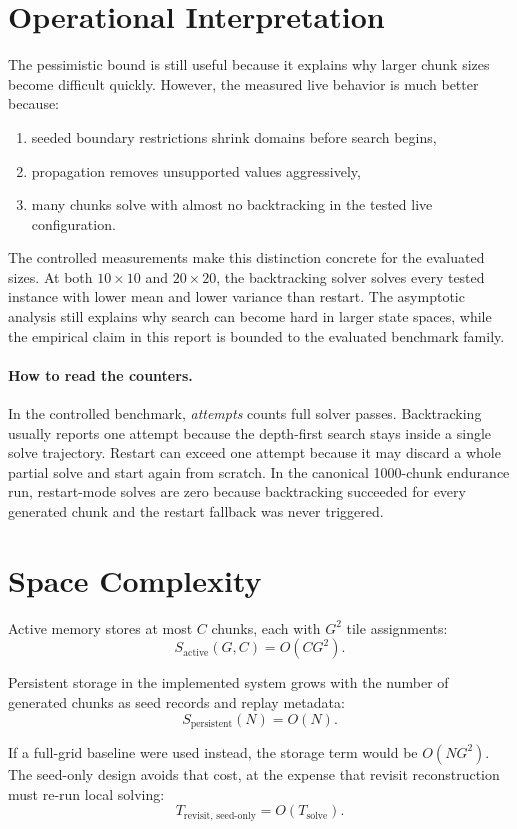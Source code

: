 \documentclass[12pt,a4paper]{report}
\begin{document}
\section{Operational Interpretation}
The pessimistic bound is still useful because it explains why larger chunk sizes become difficult quickly. However, the measured live behavior is much better because:
\begin{enumerate}
\item seeded boundary restrictions shrink domains before search begins,
\item propagation removes unsupported values aggressively,
\item many chunks solve with almost no backtracking in the tested live configuration.
\end{enumerate}

The controlled measurements make this distinction concrete for the evaluated sizes. At both $10 \times 10$ and $20 \times 20$, the backtracking solver solves every tested instance with lower mean and lower variance than restart. The asymptotic analysis still explains why search can become hard in larger state spaces, while the empirical claim in this report is bounded to the evaluated benchmark family.

\paragraph{How to read the counters.} In the controlled benchmark, \emph{attempts} counts full solver passes. Backtracking usually reports one attempt because the depth-first search stays inside a single solve trajectory. Restart can exceed one attempt because it may discard a whole partial solve and start again from scratch. In the canonical 1000-chunk endurance run, restart-mode solves are zero because backtracking succeeded for every generated chunk and the restart fallback was never triggered.

\section{Space Complexity}
Active memory stores at most $C$ chunks, each with $G^2$ tile assignments:
\[
S_{\text{active}}(G,C) = O(CG^2).
\]

Persistent storage in the implemented system grows with the number of generated chunks as seed records and replay metadata:
\[
S_{\text{persistent}}(N) = O(N).
\]

If a full-grid baseline were used instead, the storage term would be $O(NG^2)$. The seed-only design avoids that cost, at the expense that revisit reconstruction must re-run local solving:
\[
T_{\text{revisit, seed-only}} = O(T_{\text{solve}}).
\]
\end{document}
